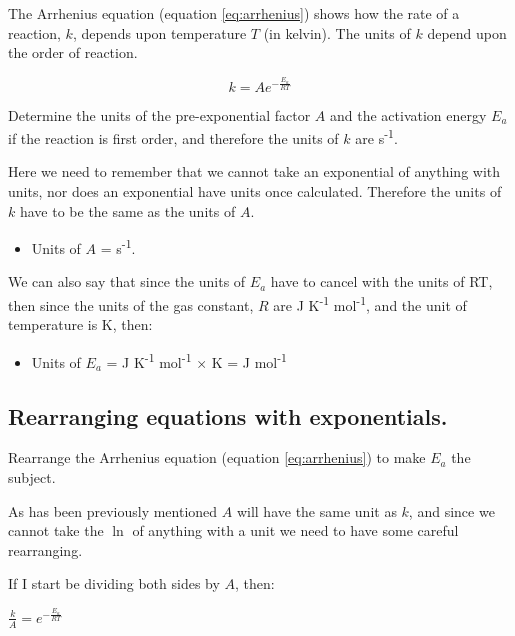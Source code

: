 \documentclass[
]{book}
\providecommand{\tightlist}{%
  \setlength{\itemsep}{0pt}\setlength{\parskip}{0pt}}
\begin{document}
The Arrhenius equation (equation \eqref{eq:arrhenius}) shows how the rate of a reaction, \(k\), depends upon temperature \(T\) (in kelvin). The units of \(k\) depend upon the order of reaction.

\begin{equation}
k = A e^{-\frac{E_a}{RT}}
\label{eq:arrhenius}
\end{equation}

Determine the units of the pre-exponential factor \(A\) and the activation energy \(E_a\) if the reaction is first order, and therefore the units of \(k\) are s\textsuperscript{-1}.

Here we need to remember that we cannot take an exponential of anything with units, nor does an exponential have units once calculated. Therefore the units of \(k\) have to be the same as the units of \(A\).

\begin{itemize}
\tightlist
\item
  Units of \(A\) = s\textsuperscript{-1}.
\end{itemize}

We can also say that since the units of \(E_a\) have to cancel with the units of RT, then since the units of the gas constant, \(R\) are J K\textsuperscript{-1} mol\textsuperscript{-1}, and the unit of temperature is K, then:

\begin{itemize}
\tightlist
\item
  Units of \(E_a\) = J K\textsuperscript{-1} mol\textsuperscript{-1} × K = J mol\textsuperscript{-1}
\end{itemize}

\hypertarget{rearranging-equations-with-exponentials.}{%
\subsection{Rearranging equations with exponentials.}\label{rearranging-equations-with-exponentials.}}

Rearrange the Arrhenius equation (equation \eqref{eq:arrhenius}) to make \(E_a\) the subject.

As has been previously mentioned \(A\) will have the same unit as \(k\), and since we cannot take the \(\ln\) of anything with a unit we need to have some careful rearranging.

If I start be dividing both sides by \(A\), then:

\(\frac{k}{A}=e^{-\frac{E_a}{RT}}\)
\end{document}
